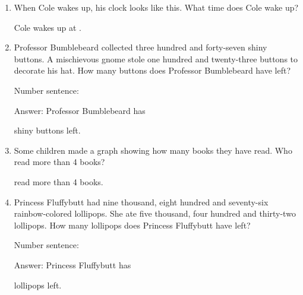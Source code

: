 \documentclass{tufte-book}
\begin{document}
\begin{enumerate}

\item {}
When Cole wakes up, his clock looks like this. What time does Cole wake up?\medskip

Cole wakes up at \dotfill\medskip.

\item
  Professor Bumblebeard collected three hundred and forty-seven shiny
  buttons. A mischievous gnome stole one hundred and twenty-three
  buttons to decorate his hat. How many buttons does Professor
  Bumblebeard have left?\medskip\par
  Number sentence:
  \dotfill\medskip\par
  Answer: Professor Bumblebeard has
  \dotfill\medskip\par\mbox{}\dotfill\medskip\par\mbox{}\dotfill\bigskip
  shiny buttons left.

\item {}
Some children made a graph showing how many books they have read.
Who read more than 4 books?\medskip

\dotfill\medskip
read more than 4 books.

\item
  Princess Fluffybutt had nine thousand, eight hundred and seventy-six
  rainbow-colored lollipops. She ate five thousand, four hundred and
  thirty-two lollipops. How many lollipops does Princess Fluffybutt have
  left?\medskip\par
  Number sentence:
  \dotfill\medskip\par
  Answer: Princess Fluffybutt has
  \dotfill\medskip\par\mbox{}\dotfill\medskip\par\mbox{}\dotfill\bigskip
  lollipops left.

\end{enumerate}
\end{document}
